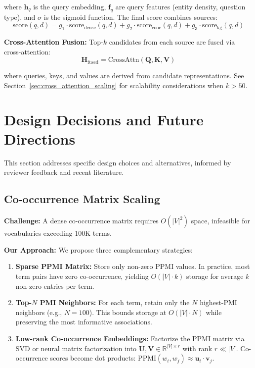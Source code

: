 \documentclass[11pt,a4paper]{article}
\begin{document}
where $\mathbf{h}_q$ is the query embedding, $\mathbf{f}_q$ are query features (entity density, question type), and $\sigma$ is the sigmoid function. The final score combines sources:
\begin{equation}
\text{score}(q, d) = g_1 \cdot \text{score}_{\text{dense}}(q, d) + g_2 \cdot \text{score}_{\text{cooc}}(q, d) + g_3 \cdot \text{score}_{\text{kg}}(q, d)
\end{equation}

\textbf{Cross-Attention Fusion:} Top-$k$ candidates from each source are fused via cross-attention:
\begin{equation}
\mathbf{H}_{\text{fused}} = \text{CrossAttn}(\mathbf{Q}, \mathbf{K}, \mathbf{V})
\end{equation}

where queries, keys, and values are derived from candidate representations. See Section~\ref{sec:cross_attention_scaling} for scalability considerations when $k > 50$.

\section{Design Decisions and Future Directions}
\label{sec:design_decisions}

This section addresses specific design choices and alternatives, informed by reviewer feedback and recent literature.

\subsection{Co-occurrence Matrix Scaling}
\label{sec:cooccurrence_scaling}

\textbf{Challenge:} A dense co-occurrence matrix requires $O(|V|^2)$ space, infeasible for vocabularies exceeding 100K terms.

\textbf{Our Approach:} We propose three complementary strategies:

\begin{enumerate}
    \item \textbf{Sparse PPMI Matrix:} Store only non-zero PPMI values. In practice, most term pairs have zero co-occurrence, yielding $O(|V| \cdot k)$ storage for average $k$ non-zero entries per term.
    
    \item \textbf{Top-$N$ PMI Neighbors:} For each term, retain only the $N$ highest-PMI neighbors (e.g., $N = 100$). This bounds storage at $O(|V| \cdot N)$ while preserving the most informative associations.
    
    \item \textbf{Low-rank Co-occurrence Embeddings:} Factorize the PPMI matrix via SVD or neural matrix factorization into $\mathbf{U}, \mathbf{V} \in \mathbb{R}^{|V| \times r}$ with rank $r \ll |V|$. Co-occurrence scores become dot products: $\text{PPMI}(w_i, w_j) \approx \mathbf{u}_i \cdot \mathbf{v}_j$.
\end{enumerate}
\end{document}

